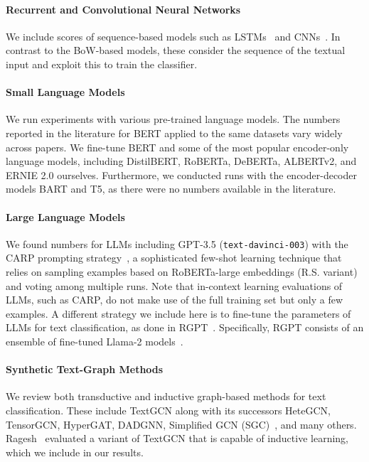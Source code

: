 \documentclass[lettersize,journal]{IEEEtran}
\newcommand{\LLMs}{LLMs\xspace}
\begin{document}
\paragraph{Recurrent and Convolutional Neural Networks} We include scores of sequence-based models such as LSTMs~\cite{DBLP:conf/emnlp/DingWLLL20,zhao2021sequential} and CNNs~\cite{DBLP:conf/ijcnlp/ZhangW17,DBLP:conf/emnlp/Kim14}.
In contrast to the BoW-based models, these consider the sequence of the textual input and exploit this to train the classifier.

\paragraph{Small Language Models}
We run experiments with various pre-trained language models.
The numbers reported in the literature for BERT applied to the same datasets vary widely across papers. 
We fine-tune BERT and some of the most popular encoder-only language models, including DistilBERT, RoBERTa, DeBERTa,  ALBERTv2, and ERNIE 2.0 ourselves.
Furthermore, we conducted runs with the encoder-decoder models BART and T5, as there were no numbers available in the literature.

\paragraph{Large Language Models}
We found numbers for \LLMs including GPT-3.5 (\texttt{text-davinci-003}) with the CARP prompting strategy~\cite{carp}, a sophisticated few-shot learning technique that relies on sampling examples based on RoBERTa-large embeddings (R.S. variant) and voting among multiple runs. 
Note that in-context learning evaluations of LLMs, such as CARP, do not make use of the full training set but only a few examples. 
A different strategy we include here is to fine-tune the parameters of LLMs for text classification, as done in RGPT~\cite{pushing-the-limit-11346014-rgpt}. Specifically, RGPT consists of an ensemble of fine-tuned Llama-2 models~\cite{touvronLlamaOpenFoundation2023}.

\paragraph{Synthetic Text-Graph Methods}

We review both transductive and inductive graph-based methods for text classification.
These include TextGCN along with its successors HeteGCN, TensorGCN, HyperGAT,
DADGNN, Simplified GCN (SGC)~\cite{DBLP:conf/icml/WuSZFYW19}, and many others.
Ragesh~\etal\cite{DBLP:conf/wsdm/RageshSIBL21} evaluated a variant of TextGCN that is capable of inductive learning, which we include in our results. 
\end{document}
